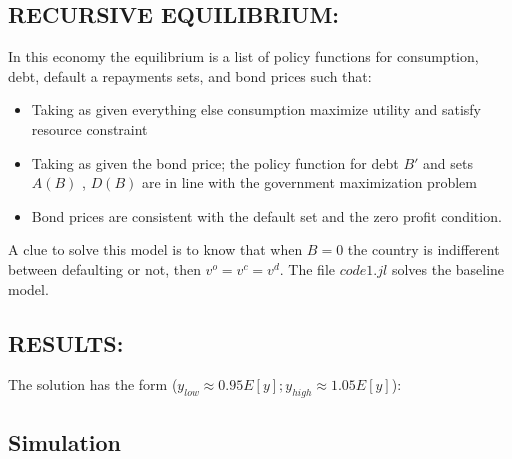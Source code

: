 \documentclass[11pt, a4paper]{article}
\theoremstyle{definition}
\begin{document}
	\subsection{RECURSIVE EQUILIBRIUM:}
	In this economy the equilibrium is a list of policy functions for consumption, debt, default a repayments sets, and bond prices such that:
	\begin{itemize}
		\item Taking as given everything else consumption maximize utility and satisfy resource constraint
		\item Taking as given the bond price; the policy function for debt $B'$ and sets $A(B)$ , $D(B)$ are in line with the government maximization problem
		\item Bond prices are consistent with the default set and the zero profit condition.
	\end{itemize}
	A clue to solve this model is to know that when $B=0$ the country is indifferent between defaulting or not, then $v^o=v^c=v^d$. The file $code1.jl$ solves the baseline model.
	\clearpage
	\subsection{RESULTS:}
	The solution has the form ($y_{low}\approx 0.95 E[y] ; y_{high}\approx 1.05 E[y]$):
	\clearpage
	\subsection{Simulation}
\end{document}
